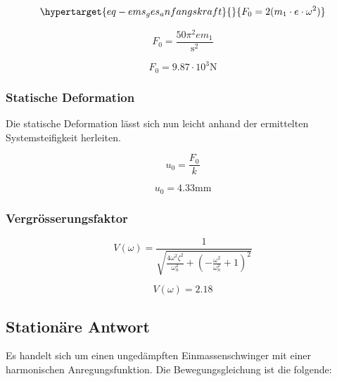 \documentclass[
  letterpaper,
  DIV=11]{scrreprt}
\begin{document}
\begin{equation}\protect\hypertarget{eq-ems_ges_anfangskraft}{}{
F_0 = 2(m_1 \cdot e \cdot \omega^2)
}\label{eq-ems_ges_anfangskraft}\end{equation}

\begin{equation}F_{0} = \frac{50 \pi^{2} e m_{1}}{\text{s}^{2}}\end{equation}

\begin{equation}F_{0} = 9.87 \cdot 10^{3} \text{N}\end{equation}

\hypertarget{statische-deformation}{%
\subsubsection{Statische Deformation}\label{statische-deformation}}

Die statische Deformation lässt sich nun leicht anhand der ermittelten
Systemsteifigkeit herleiten.

\begin{equation}u_{0} = \frac{F_{0}}{k}\end{equation}

\begin{equation}u_{0} = 4.33 \text{mm}\end{equation}

\hypertarget{vergruxf6sserungsfaktor-1}{%
\subsubsection{Vergrösserungsfaktor}\label{vergruxf6sserungsfaktor-1}}

\begin{equation}V{\left(\omega \right)} = \frac{1}{\sqrt{\frac{4 \omega^{2} \zeta_{}^{2}}{\omega_{n}^{2}} + \left(- \frac{\omega^{2}}{\omega_{n}^{2}} + 1\right)^{2}}}\end{equation}

\begin{equation}V{\left(\omega \right)} = 2.18\end{equation}

\hypertarget{stationuxe4re-antwort}{%
\subsection{Stationäre Antwort}\label{stationuxe4re-antwort}}

Es handelt sich um einen ungedämpften Einmassenschwinger mit einer
harmonischen Anregungsfunktion. Die Bewegungsgleichung ist die folgende:
\end{document}
